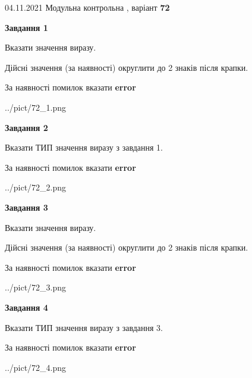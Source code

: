 \documentclass[11pt, ukrainian]{article}
\begin{document}
{04.11.2021 Модульна контрольна , варіант  \No \textbf { 72 }\par}
{
\begin {large}
{\begin {center}\textbf{Завдання 1}\end {center}}\par
Вказати значення виразу. \par
Дійсні значення (за наявності) округлити до 2 знаків після крапки. \par
За наявності помилок вказати \textbf{error}

\begin{center}
	{../pict/72_1.png}
\end{center}
\newpage

{\begin {center}\textbf{Завдання 2}\end {center}}\par
Вказати ТИП значення виразу з завдання 1. \par
За наявності помилок вказати \textbf{error}

\begin{center}
	{../pict/72_2.png}
\end{center}
\newpage

{\begin {center}\textbf{Завдання 3}\end {center}}\par
Вказати значення виразу. \par
Дійсні значення (за наявності) округлити до 2 знаків після крапки. \par
За наявності помилок вказати \textbf{error}

\begin{center}
	{../pict/72_3.png}
\end{center}
\newpage

{\begin {center}\textbf{Завдання 4}\end {center}}\par
Вказати ТИП значення виразу з завдання 3. \par
За наявності помилок вказати \textbf{error}

\begin{center}
	{../pict/72_4.png}
\end{center}
\newpage


\end{large}}
\end{document}
